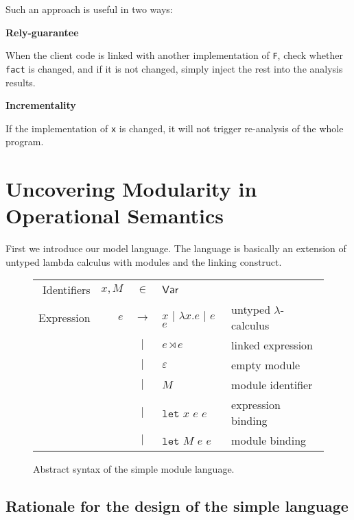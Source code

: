 \documentclass[acmsmall,review]{acmart}\settopmatter{printfolios=true,printccs=false,printacmref=false}
\theoremstyle{definition}
\theoremstyle{plain}
\newcommand*{\vbar}{|}
\newcommand*{\ExprVar}{\mathsf{Var}}
\newcommand*{\link}[2]{{#1}\rtimes{#2}}
\newcommand*{\Let}{\mathtt{let}}
\begin{document}
Such an approach is useful in two ways:

\noindent\textbf{Rely-guarantee}

When the client code is linked with another implementation of \texttt{F}, check whether \texttt{fact} is changed, and if it is not changed, simply inject the rest into the analysis results.

\noindent\textbf{Incrementality}

If the implementation of \texttt{x} is changed, it will not trigger re-analysis of the whole program.

\section{Uncovering Modularity in Operational Semantics}
First we introduce our model language.
The language is basically an extension of untyped lambda calculus with modules and the linking construct.

\begin{figure}[htb]
  \centering
  \begin{tabular}{rrcll}
    Identifiers & $x,M$ & $\in$         & $\ExprVar$                                                             \\
    Expression  & $e$   & $\rightarrow$ & $x$ $\vbar$ $\lambda x.e$ $\vbar$ $e$ $e$ & untyped $\lambda$-calculus \\
                &       & $\vbar$       & $\link{e}{e}$                             & linked expression          \\
                &       & $\vbar$       & $\varepsilon$                             & empty module               \\
                &       & $\vbar$       & $M$                                       & module identifier          \\
                &       & $\vbar$       & $\Let$ $x$ $e$ $e$                        & expression binding         \\
                &       & $\vbar$       & $\Let$ $M$ $e$ $e$                        & module binding             \\
  \end{tabular}
  \caption{Abstract syntax of the simple module language.}
\end{figure}
\subsection{Rationale for the design of the simple language}
\end{document}
